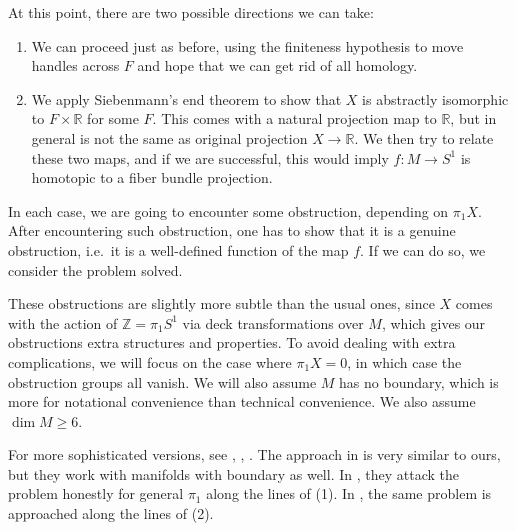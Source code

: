 \documentclass[a4paper, 12pt]{article}
\theoremstyle{definition}
\newcommand\Z{\mathbb{Z}}
\newcommand\R{\mathbb{R}}
\begin{document}
At this point, there are two possible directions we can take:
\begin{enumerate}
  \item We can proceed just as before, using the finiteness hypothesis to move handles across $F$ and hope that we can get rid of all homology.
  \item We apply Siebenmann's end theorem to show that $X$ is abstractly isomorphic to $F \times \R$ for some $F$. This comes with a natural projection map to $\R$, but in general is not the same as original projection $X \to \R$. We then try to relate these two maps, and if we are successful, this would imply $f: M \to S^1$ is homotopic to a fiber bundle projection.
\end{enumerate}
In each case, we are going to encounter some obstruction, depending on $\pi_1 X$. After encountering such obstruction, one has to show that it is a genuine obstruction, i.e.\ it is a well-defined function of the map $f$. If we can do so, we consider the problem solved.

These obstructions are slightly more subtle than the usual ones, since $X$ comes with the action of $\Z = \pi_1S^1$ via deck transformations over $M$, which gives our obstructions extra structures and properties. To avoid dealing with extra complications, we will focus on the case where $\pi_1 X = 0$, in which case the obstruction groups all vanish. We will also assume $M$ has no boundary, which is more for notational convenience than technical convenience. We also assume $\dim M \geq 6$.

For more sophisticated versions, see \cite{browder-levine}, \cite{farrell-fiber}, \cite{siebenmann-fiber}. The approach in \cite{browder-levine} is very similar to ours, but they work with manifolds with boundary as well. In \cite{farrell-fiber}, they attack the problem honestly for general $\pi_1$ along the lines of (1). In \cite{siebenmann-fiber}, the same problem is approached along the lines of (2).
\end{document}
